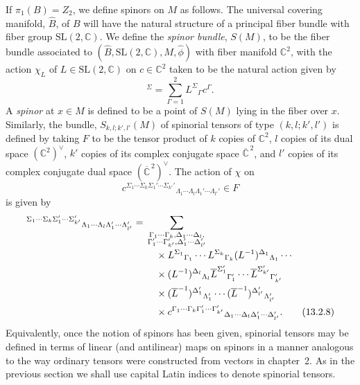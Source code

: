 If \(\pi_1(B)=Z_2\), we define spinors on \(M\) as follows. The universal covering
manifold, \(\widehat B\), of \(B\) will have the natural structure of a principal
fiber bundle with fiber group \(\mathrm{SL}(2,\mathbb C)\). We define the
\emph{spinor bundle}, \(S(M)\), to be the fiber bundle associated to
\((\widehat B,\mathrm{SL}(2,\mathbb C),M,\widehat\phi)\) with fiber manifold
\(\mathbb C^2\), with the action \(\chi_L\) of
\(L\in\mathrm{SL}(2,\mathbb C)\) on \(c\in\mathbb C^2\) taken to be the natural
action given by
\begin{equation}
  [\chi_L(c)]^\Sigma=\sum_{\Gamma=1}^2L^\Sigma{}_\Gamma c^\Gamma.
  \tag{13.2.7}\label{eq:13.2.7}
\end{equation}
A \emph{spinor} at \(x\in M\) is defined to be a point of \(S(M)\) lying in the
fiber over \(x\). Similarly, the bundle,
\(S_{k,l;k',l'}(M)\) of spinorial tensors of type \((k,l;k',l')\) is defined by
taking \(F\) to be the tensor product of \(k\) copies of \(\mathbb C^2\), \(l\)
copies of its dual space \((\mathbb C^2)^\vee\), \(k'\) copies of its complex conjugate
space \(\overline{\mathbb C}^{\,2}\), and \(l'\) copies of its complex conjugate
dual space \((\overline{\mathbb C}^{\,2})^\vee\). The action of \(\chi\) on
\[
  c^{\Sigma_1\cdots\Sigma_k\Sigma_1'\cdots\Sigma_{k'}'}
    {}_{\Lambda_1\cdots\Lambda_l\Lambda_1'\cdots\Lambda_{l'}'}\in F
\]
is given by
\begin{align}
  [\chi_L(c)]^{\Sigma_1\cdots\Sigma_k\Sigma_1'\cdots\Sigma_{k'}'}
    {}_{\Lambda_1\cdots\Lambda_l\Lambda_1'\cdots\Lambda_{l'}'}
  ={}&\sum_{\substack{
          \Gamma_1\cdots\Gamma_k,\Delta_1\cdots\Delta_l,\\[-.25ex]
          \Gamma_1'\cdots\Gamma_{k'}',\Delta_1'\cdots\Delta_{l'}'}}\notag\\[-.5ex]
  &{}\quad\times L^{\Sigma_1}{}_{\Gamma_1}\cdots
    L^{\Sigma_k}{}_{\Gamma_k}
    (L^{-1})^{\Delta_1}{}_{\Lambda_1}\cdots\notag\\
  &{}\quad\times (L^{-1})^{\Delta_l}{}_{\Lambda_l}
    \overline L^{\Sigma_1'}{}_{\Gamma_1'}\cdots
    \overline L^{\Sigma_{k'}'}{}_{\Gamma_{k'}'}\notag\\
  &{}\quad\times(\overline L^{-1})^{\Delta_1'}{}_{\Lambda_1'}\cdots
    (\overline L^{-1})^{\Delta_{l'}'}{}_{\Lambda_{l'}'}\notag\\
  &{}\quad\times
  c^{\Gamma_1\cdots\Gamma_k\Gamma_1'\cdots\Gamma_{k'}'}
    {}_{\Delta_1\cdots\Delta_l\Delta_1'\cdots\Delta_{l'}'}.
  \tag{13.2.8}\label{eq:13.2.8}
\end{align}
Equivalently, once the notion of spinors has been given, spinorial tensors may be
defined in terms of linear (and antilinear) maps on spinors in a manner analogous to
the way ordinary tensors were constructed from vectors in chapter~2. As in the
previous section we shall use capital Latin indices to denote spinorial tensors.

